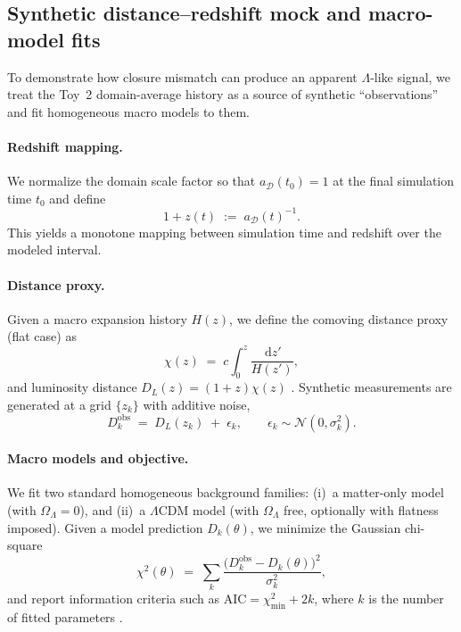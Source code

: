 \documentclass[11pt]{article}
\newcommand{\dd}{\,\mathrm{d}}
\theoremstyle{definition}
\theoremstyle{plain}
\theoremstyle{remark}
\begin{document}
\subsection{Synthetic distance--redshift mock and macro-model fits}\label{sec:methods:synthetic_distance}
To demonstrate how closure mismatch can produce an apparent $\Lambda$-like signal, we treat the Toy~2 domain-average history as a source of synthetic ``observations'' and fit homogeneous macro models to them.

\paragraph{Redshift mapping.}
We normalize the domain scale factor so that $a_{\mathcal{D}}(t_0)=1$ at the final simulation time $t_0$ and define
\begin{equation}
1+z(t) \;:=\; a_{\mathcal{D}}(t)^{-1}.
\label{eq:synthetic_z_def}
\end{equation}
This yields a monotone mapping between simulation time and redshift over the modeled interval.

\paragraph{Distance proxy.}
Given a macro expansion history $H(z)$, we define the comoving distance proxy (flat case) as
\begin{equation}
\chi(z) \;=\; c\int_{0}^{z}\frac{\dd z'}{H(z')},
\label{eq:chi_def}
\end{equation}
and luminosity distance $D_L(z)=(1+z)\chi(z)$ \cite{Hogg1999Distance}.
Synthetic measurements are generated at a grid $\{z_k\}$ with additive noise,
\begin{equation}
D^{\mathrm{obs}}_k \;=\; D_L(z_k) \;+\; \epsilon_k,\qquad \epsilon_k\sim\mathcal{N}(0,\sigma_k^2).
\label{eq:distance_mock}
\end{equation}

\paragraph{Macro models and objective.}
We fit two standard homogeneous background families:
(i)~a matter-only model (with $\Omega_\Lambda=0$), and
(ii)~a $\Lambda$CDM model (with $\Omega_\Lambda$ free, optionally with flatness imposed).
Given a model prediction $D_k(\theta)$, we minimize the Gaussian chi-square
\begin{equation}
\chi^2(\theta) \;=\; \sum_{k}\frac{\big(D^{\mathrm{obs}}_k - D_k(\theta)\big)^2}{\sigma_k^2},
\label{eq:chi2_def}
\end{equation}
and report information criteria such as $\mathrm{AIC}=\chi^2_{\min}+2k$, where $k$ is the number of fitted parameters \cite{Akaike1974AIC,Schwarz1978BIC}.
\end{document}
